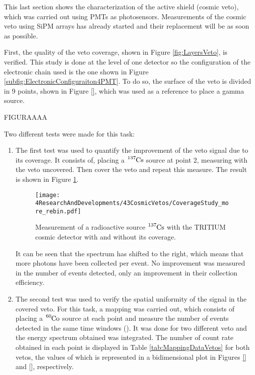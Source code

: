 This last section shows the characterization of the active shield (cosmic veto), which was carried out using PMTs as photosensors. Measurements of the cosmic veto using SiPM arrays has already started and their replacement will be as soon as possible. 

First, the quality of the veto coverage, shown in Figure \ref{fig:LayersVeto}, is verified. This study is done at the level of one detector so the configuration of the electronic chain used is the one shown in Figure \ref{subfig:ElectronicConfiguraiton4PMT}. To do so, the surface of the veto is divided in 9 points, shown in Figure \ref{}, which was used as a reference to place a gamma source.

FIGURAAAA

Two different tests were made for this task:
\begin{enumerate}

\item{} The first test was used to quantify the improvement of the veto signal due to its coverage. It consists of, placing a $\ce{^{137}Cs}$ source at point 2, measuring with the veto uncovered. Then cover the veto and repeat this measure. The result is shown in Figure \ref{fig:VetoCoverageImprovement}.

\begin{figure}[h]
\centering
\texttt{[image: 4ResearchAndDevelopments/43CosmicVetos/CoverageStudy\_more\_rebin.pdf]}
\caption{Measurement of a radioactive source $\ce{^{137}Cs}$ with the TRITIUM cosmic detector with and without its coverage.\label{fig:VetoCoverageImprovement}}
\end{figure}

It can be seen that the spectrum has shifted to the right, which means that more photons have been collected per event. No improvement was measured in the number of events detected, only an improvement in their collection efficiency.


\item{} The second test was used to verify the spatial uniformity of the signal in the covered veto. For this task, a mapping was carried out, which consists of placing a $\ce{^{60}Co}$ source at each point and measure the number of events detected in the same time windows (). It was done for two different veto and the energy spectrum obtained was integrated. The number of count rate obtained in each point is displayed in Table \ref{tab:MappingDataVetos} for both vetos, the values of which is represented in a bidimensional plot in Figures \ref{} and \ref{}, respectively.


\end{enumerate}
